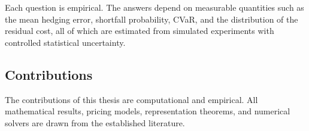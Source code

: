 Each question is empirical. The answers depend on measurable quantities such as the mean hedging error, shortfall probability, CVaR, and the distribution of the residual cost, all of which are estimated from simulated experiments with controlled statistical uncertainty.



\subsection{Contributions}
\label{subsec:contributions}

The contributions of this thesis are computational and empirical.  All
mathematical results, pricing models, representation theorems, and
numerical solvers are drawn from the established literature.

